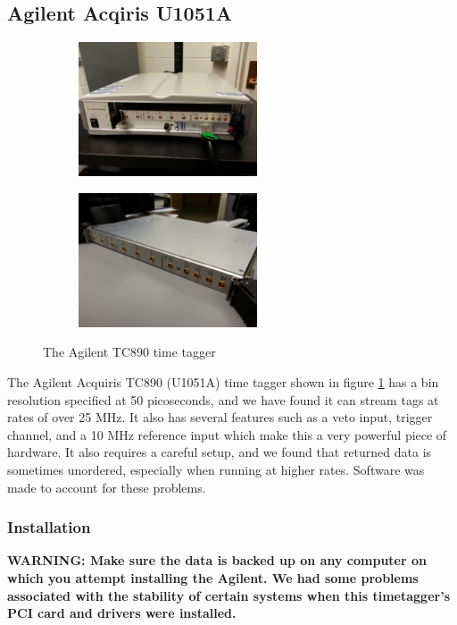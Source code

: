 \documentclass[10pt]{article}
\begin{document}
\subsection{Agilent Acqiris U1051A}
\begin{figure}
\centering
\begin{subfigure}[b]{0.4\textwidth}
\includegraphics[width=200px,angle=180]{Agilent1.jpg}
\end{subfigure}
\qquad
\begin{subfigure}[b]{0.4\textwidth}
\includegraphics[width=200px,angle=180]{Agilent2.jpg}
\end{subfigure}
\caption{The Agilent TC890 time tagger}
\label{fig:agilent_pic}
\end{figure}

The Agilent Acquiris TC890 (U1051A) time tagger shown in figure \ref{fig:agilent_pic} has a bin resolution specified at 50 picoseconds,
and we have found it can stream tags at rates of over 25 MHz. It also has several features such as a veto input,
trigger channel, and a 10 MHz reference input which make this a very powerful piece of hardware.
It also requires a careful setup, and we found that returned data is sometimes unordered, especially when running
at higher rates. Software was made to account for these problems.

\subsubsection{Installation}

\textbf{WARNING: Make sure the data is backed up on any computer on which you attempt installing the Agilent. We had some problems associated with the stability of certain systems when this timetagger's PCI card and drivers were installed.}
\end{document}
